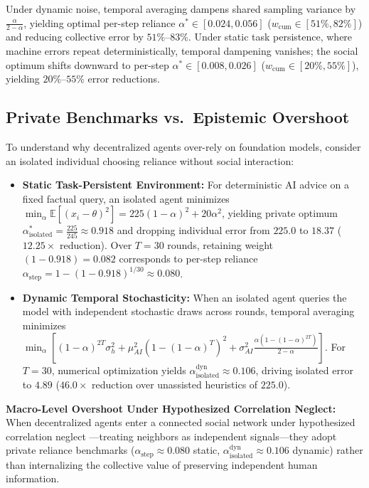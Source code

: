 \documentclass
[letterpaper]{article}
\begin{document}
Under dynamic noise, temporal averaging dampens shared sampling variance by $\frac{\alpha}{2-\alpha}$, yielding optimal per-step reliance $\alpha^* \in [0.024, 0.056]$ ($w_{\text{cum}} \in [51\%, 82\%]$) and reducing collective error by $51\%\text{--}83\%$. Under static task persistence, where machine errors repeat deterministically, temporal dampening vanishes; the social optimum shifts downward to per-step $\alpha^* \in [0.008, 0.026]$ ($w_{\text{cum}} \in [20\%, 55\%]$), yielding $20\%\text{--}55\%$ error reductions.

\subsection{Private Benchmarks vs.\ Epistemic Overshoot}
To understand why decentralized agents over-rely on foundation models, consider an isolated individual choosing reliance without social interaction:
\begin{itemize}\setlength{\itemsep}{0pt}\setlength{\parskip}{0pt}\setlength{\parsep}{0pt}
    \item \textbf{Static Task-Persistent Environment:} For deterministic AI advice on a fixed factual query, an isolated agent minimizes $\min_{\alpha} \mathbb{E}[(x_i - \theta)^2] = 225 (1 - \alpha)^2 + 20 \alpha^2$, yielding private optimum $\alpha_{\text{isolated}}^* = \frac{225}{245} \approx 0.918$ and dropping individual error from $225.0$ to $18.37$ ($12.25\times$ reduction). Over $T=30$ rounds, retaining weight $(1 - 0.918) = 0.082$ corresponds to per-step reliance $\alpha_{\text{step}} = 1 - (1 - 0.918)^{1/30} \approx 0.080$.
    \item \textbf{Dynamic Temporal Stochasticity:} When an isolated agent queries the model with independent stochastic draws across rounds, temporal averaging minimizes $\min_\alpha [(1 - \alpha)^{2T}\sigma_h^2 + \mu_{AI}^2(1 - (1-\alpha)^T)^2 + \sigma_{AI}^2 \frac{\alpha(1 - (1-\alpha)^{2T})}{2-\alpha}]$. For $T=30$, numerical optimization yields $\alpha_{\text{isolated}}^{\text{dyn}} \approx 0.106$, driving isolated error to $4.89$ ($46.0\times$ reduction over unassisted heuristics of $225.0$).
\end{itemize}

\textbf{Macro-Level Overshoot Under Hypothesized Correlation Neglect:} When decentralized agents enter a connected social network under hypothesized correlation neglect \citep{demarzo2003persuasion, enke2019correlation}—treating neighbors as independent signals—they adopt private reliance benchmarks ($\alpha_{\text{step}} \approx 0.080$ static, $\alpha_{\text{isolated}}^{\text{dyn}} \approx 0.106$ dynamic) rather than internalizing the collective value of preserving independent human information.
\end{document}
